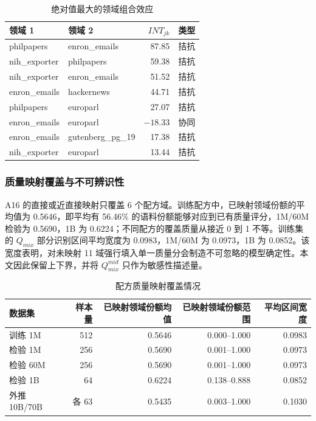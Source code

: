 \documentclass[bwprint]{gmcmthesis}
\numberwithin{equation}{section}
\numberwithin{figure}{section}
\numberwithin{table}{section}
\begin{document}
        \begin{table}[H]
        \centering
        \caption{绝对值最大的领域组合效应}  %
        \label{tab:interactions}
        \begin{tabular}{llrr}
        \toprule
        领域 1 & 领域 2 & $INT_{jk}$ & 类型 \\
        \midrule
        philpapers & enron\_emails & 87.85 & 拮抗 \\
        nih\_exporter & philpapers & 59.38 & 拮抗 \\
        nih\_exporter & enron\_emails & 51.52 & 拮抗 \\
        enron\_emails & hackernews & 44.71 & 拮抗 \\
        philpapers & europarl & 27.07 & 拮抗 \\
        enron\_emails & europarl & $-18.33$ & 协同 \\
        enron\_emails & gutenberg\_pg\_19 & 17.38 & 拮抗 \\
        nih\_exporter & europarl & 13.44 & 拮抗 \\
        \bottomrule
        \end{tabular}
        \end{table}


        \subsubsection{质量映射覆盖与不可辨识性}    %
        A16 的直接或近直接映射只覆盖 6 个配方域。训练配方中，已映射领域份额的平均值为 0.5646，即平均有 56.46\% 的语料份额能够对应到已有质量评分，1M/60M 检验为 0.5690，1B 为 0.6224；不同配方的覆盖质量从接近 0 到 1 不等。训练集的 $Q_{mix}$ 部分识别区间平均宽度为 0.0983，1M/60M 为 0.0973，1B 为 0.0852。该宽度表明，对未映射 11 域强行填入单一质量分会制造不可忽略的模型确定性。本文因此保留上下界，并将 $Q_{mix}^{mid}$ 只作为敏感性描述量。
        
        \begin{table}[H]
        \centering
        \caption{配方质量映射覆盖情况}    %
        \label{tab:mapping}
        \begin{tabular}{lrrrr}
        \toprule
        数据集 & 样本量 & 已映射领域份额均值 & 已映射领域份额范围 & 平均区间宽度 \\
        \midrule
        训练 1M & 512 & 0.5646 & 0.000--1.000 & 0.0983 \\
        检验 1M & 256 & 0.5690 & 0.001--1.000 & 0.0973 \\
        检验 60M & 256 & 0.5690 & 0.001--1.000 & 0.0973 \\
        检验 1B & 64 & 0.6224 & 0.138--0.888 & 0.0852 \\
        外推 10B/70B & 各 63 & 0.5435 & 0.003--1.000 & 0.1030 \\
        \bottomrule
        \end{tabular}
        \end{table}
\end{document}
